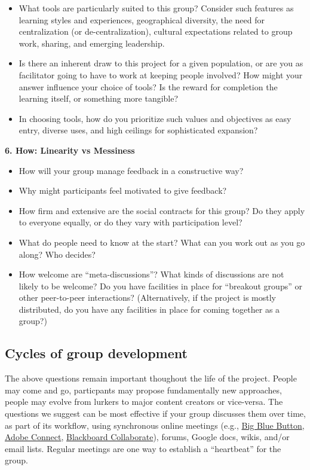 \begin{itemize}
\itemsep1pt\parskip0pt
\item
  What tools are particularly suited to this group? Consider such
  features as learning styles and experiences, geographical diversity,
  the need for centralization (or de-centralization), cultural
  expectations related to group work, sharing, and emerging leadership.
\item
  Is there an inherent draw to this project for a given population, or
  are you as facilitator going to have to work at keeping people
  involved? How might your answer influence your choice of tools? Is the
  reward for completion the learning itself, or something more tangible?
\item
  In choosing tools, how do you prioritize such values and objectives as
  easy entry, diverse uses, and high ceilings for sophisticated
  expansion?
\end{itemize}

\textbf{6. How: Linearity vs Messiness}

\begin{itemize}
\itemsep1pt\parskip0pt
\item
  How will your group manage feedback in a constructive way?
\item
  Why might participants feel motivated to give feedback?
\item
  How firm and extensive are the social contracts for this group? Do
  they apply to everyone equally, or do they vary with participation
  level?
\item
  What do people need to know at the start? What can you work out as you
  go along? Who decides?
\item
  How welcome are ``meta-discussions''? What kinds of discussions are
  not likely to be welcome? Do you have facilities in place for
  ``breakout groups'' or other peer-to-peer interactions?
  (Alternatively, if the project is mostly distributed, do you have any
  facilities in place for coming together as a group?)
\end{itemize}

\subsection{Cycles of group development}

The above questions remain important thoughout the life of the project.
People may come and go, particpants may propose fundamentally new
approaches, people may evolve from lurkers to major content creators or
vice-versa. The questions we suggest can be most effective if your group
discusses them over time, as part of its workflow, using synchronous
online meetings (e.g., \href{http://www.bigbluebutton.org/}{Big Blue
Button},
\href{http://success.adobe.com/en/na/sem/products/connect/1109_6011_connect_webinars.html?sdid=IEASO\&skwcid=TC\textbar{}22191\textbar{}adobe\%20connect\textbar{}\textbar{}S\textbar{}e\textbar{}5894715262}{Adobe
Connect},
\href{http://www.blackboard.com/platforms/collaborate/overview.aspx}{Blackboard
Collaborate}), forums, Google docs, wikis, and/or email lists. Regular
meetings are one way to establish a ``heartbeat'' for the group.

